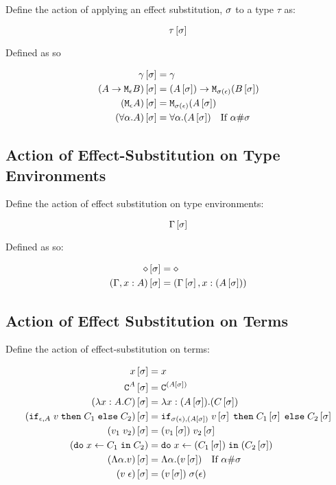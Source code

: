 {    Define the action of applying an effect substitution, $\si$ to a type $\tau$ as:

    $$\tau\sub{\si}$$

    Defined as so

    \begin{align}
        \g\sub{\si} &= \g \\
        (\lamtype{A}{\e}{B})\sub{\si} &= \lamtype{(A\sub{\si})}{\si(\e)}{(B\sub{\si})} \\
        (\M{\e}{A})\ssi &= \M{\si(\e)}{(A\ssi)}\\
        (\all{\a}{A})\ssi &= \all{\a}{(A\ssi)}\qt{If $\a\#\si$}
    \end{align}


    \subsection{Action of Effect-Substitution on Type Environments}

    Define the action of effect substitution on type environments:
    
    $$\G\ssi$$

    Defined as so:

    \begin{align*}
        \nil\ssi & = \nil \\
        (\gax)\ssi &= (\G\ssi, x:(A\ssi))\\
    \end{align*}


    \subsection{Action of Effect Substitution on Terms}

    Define the action of effect-substitution on terms:

    \begin{align}
        x\ssi & = x \\
        \const{A}\ssi & = \const{(A\ssi)} \\
        (\lam{x}{A}{C})\ssi &= \lam{x}{(A\ssi)}{(C\ssi)}\\
        (\ifthenelse{\e}{A}{v}{C_1}{C_2})\ssi &= \ifthenelse{\si(\e)}{(A\ssi)}{v\ssi}{C_1\ssi}{C_2\ssi}\\
        (\apply{v_1}{v_2})\ssi&= \apply{(v_1\ssi)}{v_2\ssi}\\
        (\doin{x}{C_1}{C_2})&= \doin{x}{(C_1\ssi)}{(C_2\ssi)}\\
        (\elam{\a}{v})\ssi & = \elam{\a}{(v\ssi)}\qt{If $\a\#\si$}\\
        (\eapp{v}{\e})\ssi & = \eapp{(v\ssi)}{\si(\e)}\\
    \end{align}


}
